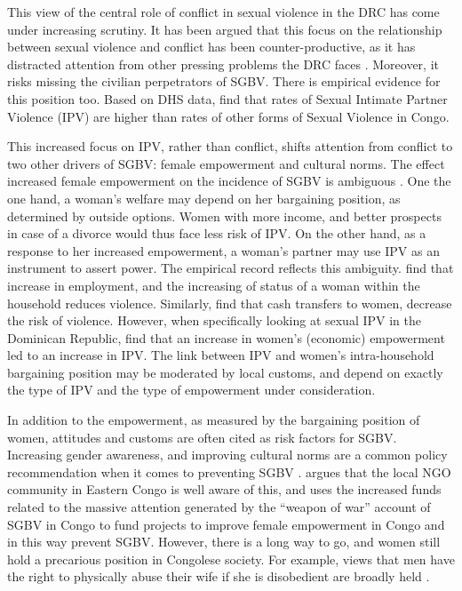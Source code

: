 \documentclass[10pt,a4paper]{scrartcl} %
\begin{document}
This view of the central role of conflict in sexual violence in the DRC has come under increasing scrutiny. It has been argued that this focus on the relationship between sexual violence and conflict has been counter-productive, as it has distracted attention from other pressing problems the DRC faces \citep{Autesserre2012a, Hilhorst2018,Porter2019}. Moreover, it risks missing the civilian perpetrators of SGBV. There is empirical evidence for this position too. Based on DHS data, \cite{Peterman2011} find that rates of Sexual Intimate Partner Violence (IPV) are higher than rates of other forms of Sexual Violence in Congo. 

This increased focus on IPV, rather than conflict, shifts attention from conflict to two other drivers of SGBV: female empowerment and cultural norms. The effect increased female empowerment on the incidence of SGBV is ambiguous \citep{Eswaran2011}. One the one hand, a woman's welfare may depend on her bargaining position, as determined by outside options. Women with more income, and better prospects in case of a divorce would thus face less risk of IPV. On the other hand, as a response to her increased empowerment, a  woman's partner may use IPV as an instrument to assert power. The empirical record reflects this ambiguity. \cite{Bhattacharya} find that increase in employment, and the increasing of status of a woman within the household reduces violence. Similarly, \cite{Hidrobo2016} find that cash transfers to women, decrease the risk of violence. However, when specifically looking at sexual IPV in the Dominican Republic, \cite{Bueno2017} find that an increase in women's (economic) empowerment led to an increase in IPV. The link between IPV and women's intra-household bargaining position may be moderated by local customs, and depend on exactly the type of IPV and the type of empowerment under consideration.

In addition to the empowerment, as measured by the bargaining position of women, attitudes and customs are often cited as risk factors for SGBV. Increasing gender awareness, and improving cultural norms are a common policy recommendation when it comes to preventing SGBV \cite[e.g.][]{Quattrochi2019,Bueno2017}. \cite{Hilhorst2018} argues that the local NGO community in Eastern Congo is well aware of this, and uses the increased funds related to the massive attention generated by the ``weapon of war'' account of SGBV in Congo to fund projects to improve female empowerment in Congo and in this way prevent SGBV.  However, there is a long way to go, and women still hold a precarious position in Congolese society. For example, views that men have the right to physically abuse their wife if she is disobedient are broadly held \citep{Quattrochi2019}.
\end{document}
